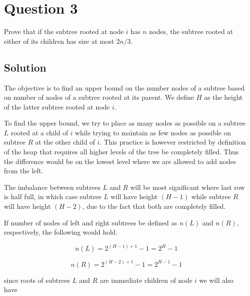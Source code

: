 
\section*{Question 3}

Prove that if the subtree rooted at node $i$ has $n$ nodes, the subtree rooted at either of its children has size at most $2n/3$.

\subsection*{Solution}

The objective is to find an upper bound on the number nodes of a subtree based on number of nodes of a subtree rooted at its parent. We define $H$ as the height of the latter subtree rooted at node $i$.

To find the upper bound, we try to place as many nodes as possible on a subtree $L$ rooted at a child of $i$ while trying to maintain as few nodes as possible on subtree $R$ at the other child of $i$. This practice is however restricted by definition of the heap that requires all higher levels of the tree be completely filled. Thus the difference would be on the lowest level where we are allowed to add nodes from the left. 

The imbalance between subtrees $L$ and $R$ will be most significant where last row is half full, in which case subtree $L$ will have height $(H-1)$ while subtree $R$ will have height $(H-2)$, due to the fact that both are completely filled.

If number of nodes of left and right subtrees be defined as $n(L)$ and $n(R)$, respectively, the following would hold.

\begin{equation}\label{eq31}
n(L) = 2^{(H-1)+1}-1 = 2^H - 1
\end{equation}

\begin{equation}\label{eq32}
n(R) = 2^{(H-2)+1}-1 = 2^{H-1} - 1
\end{equation}

since roots of subtrees $L$ and $R$ are immediate children of node $i$ we will also have

